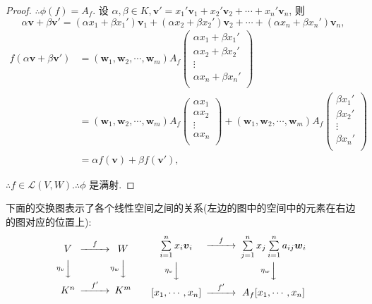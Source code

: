 \documentclass{ctexart}
\begin{document}
\begin{proof}
    $\therefore\phi(f)=A_f$. 设 $\alpha,\beta\in K,\boldsymbol{v}'=x_1'\boldsymbol{v}_1+x_2'\boldsymbol{v}_2+\cdots+x_n'\boldsymbol{v}_n$, 则
    \[\alpha\boldsymbol{v}+\beta\boldsymbol{v}'=(\alpha x_1+\beta x_1')\boldsymbol{v}_1+(\alpha x_2+\beta x_2')\boldsymbol{v}_2+\cdots+(\alpha x_n+\beta x_n')\boldsymbol{v}_n,\]
    \begin{align*}
        f(\alpha\boldsymbol{v}+\beta\boldsymbol{v}') & =(\boldsymbol{w}_1,\boldsymbol{w}_2,\cdots,\boldsymbol{w}_m)A_f\begin{pmatrix}
            \alpha x_1+\beta x_1' \\
            \alpha x_2+\beta x_2' \\
            \vdots \\
            \alpha x_n+\beta x_n' \\
        \end{pmatrix} \\
        & =(\boldsymbol{w}_1,\boldsymbol{w}_2,\cdots,\boldsymbol{w}_m)A_f\begin{pmatrix}
            \alpha x_1 \\
            \alpha x_2 \\
            \vdots \\
            \alpha x_n \\
        \end{pmatrix}+(\boldsymbol{w}_1,\boldsymbol{w}_2,\cdots,\boldsymbol{w}_m)A_f\begin{pmatrix}
            \beta x_1' \\
            \beta x_2' \\
            \vdots \\
            \beta x_n' \\
        \end{pmatrix} \\
        & =\alpha f(\boldsymbol{v})+\beta f(\boldsymbol{v}'),
    \end{align*}

    $\therefore f\in\mathcal{L}(V,W).\therefore\phi$ 是满射.
\end{proof}

下面的交换图表示了各个线性空间之间的关系(左边的图中的空间中的元素在右边的图对应的位置上):
\[\begin{CD}
    V @>f>> W \\
    @V\eta_v VV @V\eta_w VV \\
    K^n @>f'>> K^m
\end{CD}\qquad
\begin{CD}
    \sum\limits_{i=1}^nx_i\boldsymbol{v}_i @>f>> \sum\limits_{j=1}^nx_j\sum\limits_{i=1}^na_{ij}\boldsymbol{w}_i \\
    @V\eta_v VV @V\eta_w VV \\
    [x_1,\cdots,x_n] @>f'>> A_f[x_1,\cdots,x_n]
\end{CD}\]
\end{document}
